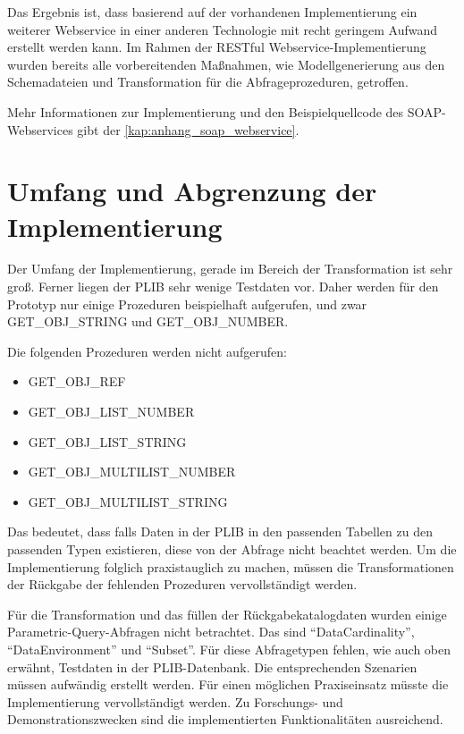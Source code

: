 Das Ergebnis ist, dass basierend auf der vorhandenen Implementierung ein weiterer Webservice in einer anderen Technologie mit recht geringem Aufwand erstellt werden kann. Im Rahmen der \gls{REST}ful \gls{Webservice}-Implementierung wurden bereits alle vorbereitenden Maßnahmen, wie Modellgenerierung aus den Schemadateien und Transformation für die Abfrageprozeduren, getroffen. 
 
Mehr Informationen zur Implementierung und den Beispielquellcode des \gls{SOAP}-\glspl{Webservice} gibt der \autoref{kap:anhang_soap_webservice}. 

\section{Umfang und Abgrenzung der Implementierung}

Der Umfang der Implementierung, gerade im Bereich der Transformation ist sehr groß. Ferner liegen der \gls{PLIB} sehr wenige Testdaten vor. Daher werden für den Prototyp nur einige Prozeduren beispielhaft aufgerufen, und zwar GET\_OBJ\_STRING und GET\_OBJ\_NUMBER. 

Die folgenden Prozeduren werden nicht aufgerufen: 
\begin{itemize}
\item GET\_OBJ\_REF
\item GET\_OBJ\_LIST\_NUMBER
\item GET\_OBJ\_LIST\_STRING
\item GET\_OBJ\_MULTILIST\_NUMBER
\item GET\_OBJ\_MULTILIST\_STRING
\end{itemize}
Das bedeutet, dass falls Daten in der \gls{PLIB} in den passenden Tabellen zu den passenden Typen existieren, diese von der Abfrage nicht beachtet werden. Um die Implementierung folglich praxistauglich zu machen, müssen die Transformationen der Rückgabe der fehlenden Prozeduren vervollständigt werden. 

Für die Transformation und das füllen der Rückgabekatalogdaten wurden einige Parametric-Query-Abfragen nicht betrachtet. Das sind \enquote{DataCardinality}, \enquote{DataEnvironment} und \enquote{Subset}. Für diese Abfragetypen fehlen, wie auch oben erwähnt, Testdaten in der \gls{PLIB}-Datenbank. Die entsprechenden Szenarien müssen aufwändig erstellt werden. Für einen möglichen Praxiseinsatz müsste die Implementierung vervollständigt werden. Zu Forschungs- und Demonstrationszwecken sind die implementierten Funktionalitäten ausreichend. 
 
